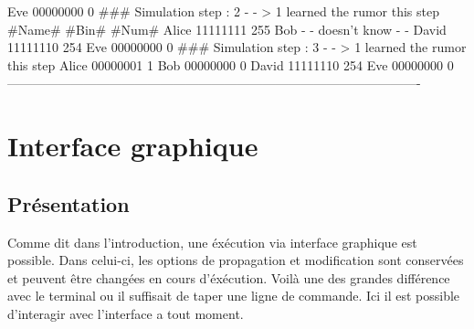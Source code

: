 \documentclass[a4paper,11pt]{article}
\begin{document}
{{\newline Eve \hspace{1.7cm} 00000000 \hspace{1.2cm} 0
\newline \#\#\# Simulation step : 2
\newline - - > 1 learned the rumor this step
\newline \#Name\# \hspace{1.3cm} \#Bin\# \hspace{1cm} \#Num\#
\newline Alice \hspace{1.5cm} 11111111 \hspace{1.1cm} 255
\newline Bob \hspace{1.7cm} - - doesn't know - -
\newline David \hspace{1.3cm} 11111110 \hspace{1.1cm} 254
\newline Eve \hspace{1.7cm} 00000000 \hspace{1.2cm} 0
\newline \#\#\# Simulation step : 3
\newline - - > 1 learned the rumor this step
\newline Alice \hspace{1.45cm} 00000001 \hspace{1.2cm} 1
\newline Bob \hspace{1.6cm} 00000000 \hspace{1.2cm} 0
\newline David \hspace{1.3cm} 11111110 \hspace{1.1cm} 254
\newline Eve \hspace{1.7cm} 00000000 \hspace{1.2cm} 0
\newline -------------------------------------------------------------------------------------------------
}
\newpage
\section {Interface graphique}
\subsection {Présentation}
{Comme dit dans l'introduction, une éxécution via interface graphique est possible. Dans celui-ci, les options de propagation 
et modification sont conservées et peuvent être changées en cours d'éxécution. Voilà une des grandes différence avec le terminal ou il suffisait 
de taper une ligne de commande. Ici il est possible d'interagir avec l'interface a tout moment.}
}
\end{document}
